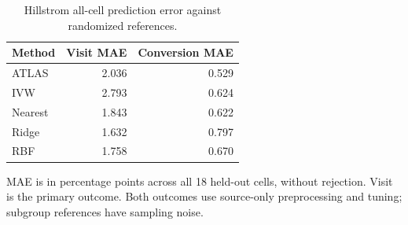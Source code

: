 \begin{table}[htbp]
\centering\small
\setlength{\tabcolsep}{4pt}
\caption{Hillstrom all-cell prediction error against randomized references.}
\label{tab:b-hillstrom-error}
\begin{tabular}{lrr}
\toprule
Method & Visit MAE & Conversion MAE \\
\midrule
ATLAS & 2.036 & 0.529 \\
IVW & 2.793 & 0.624 \\
Nearest & 1.843 & 0.622 \\
Ridge & 1.632 & 0.797 \\
RBF & 1.758 & 0.670 \\
\bottomrule
\end{tabular}
\par\smallskip\begin{minipage}{0.97\linewidth}\footnotesize MAE is in percentage points across all 18 held-out cells, without rejection. Visit is the primary outcome. Both outcomes use source-only preprocessing and tuning; subgroup references have sampling noise.\end{minipage}
\end{table}
